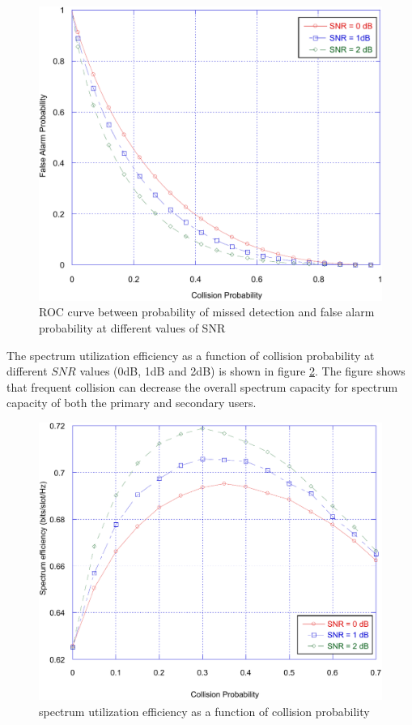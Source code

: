 \documentclass[twocolumn]{el-author}
\begin{document}
\begin{figure}
\centering
\includegraphics[width=0.7\linewidth]{./fig2_err}
\caption{ROC curve between probability of missed detection and false alarm probability at different values of SNR }
\label{fig:fig2err}
\end{figure}

The spectrum utilization efficiency as a function of collision probability at different $SNR$ values (0dB, 1dB and 2dB) is shown in figure \ref{fig:fig7err}. The figure shows that frequent collision can decrease the overall spectrum capacity for spectrum capacity of both the primary and secondary users. 
%
\begin{figure}
\centering
\includegraphics[width=0.7\linewidth]{./fig7_err}
\caption{spectrum utilization efficiency as a function of collision probability}
\label{fig:fig7err}
\end{figure}


\end{document}
